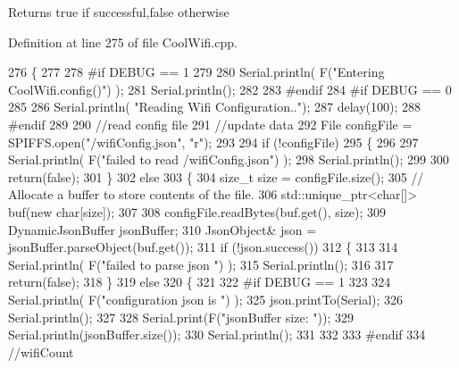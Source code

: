 \begin{DoxyReturn}{Returns}
true if successful,false otherwise 
\end{DoxyReturn}


Definition at line 275 of file Cool\+Wifi.\+cpp.


\begin{DoxyCode}
276 \{
277 
278 \textcolor{preprocessor}{#if DEBUG == 1 }
279 
280     Serial.println( F(\textcolor{stringliteral}{"Entering CoolWifi.config()"}) );
281     Serial.println();
282 
283 \textcolor{preprocessor}{#endif}
284 \textcolor{preprocessor}{#if DEBUG == 0}
285 
286     Serial.println( \textcolor{stringliteral}{"Reading Wifi Configuration.."});
287     delay(100);
288 \textcolor{preprocessor}{#endif }
289 
290     \textcolor{comment}{//read config file}
291     \textcolor{comment}{//update data}
292     File configFile = SPIFFS.open(\textcolor{stringliteral}{"/wifiConfig.json"}, \textcolor{stringliteral}{"r"});
293 
294     \textcolor{keywordflow}{if} (!configFile) 
295     \{
296     
297         Serial.println( F(\textcolor{stringliteral}{"failed to read /wifiConfig.json"}) );
298         Serial.println();
299 
300         \textcolor{keywordflow}{return}(\textcolor{keyword}{false});
301     \}
302     \textcolor{keywordflow}{else}
303     \{
304         \textcolor{keywordtype}{size\_t} size = configFile.size();
305         \textcolor{comment}{// Allocate a buffer to store contents of the file.}
306         std::unique\_ptr<char[]> buf(\textcolor{keyword}{new} \textcolor{keywordtype}{char}[size]);
307 
308         configFile.readBytes(buf.get(), size);
309         DynamicJsonBuffer jsonBuffer;
310         JsonObject& json = jsonBuffer.parseObject(buf.get());
311         \textcolor{keywordflow}{if} (!json.success()) 
312         \{
313 
314             Serial.println( F(\textcolor{stringliteral}{"failed to parse json "}) );
315             Serial.println();
316 
317             \textcolor{keywordflow}{return}(\textcolor{keyword}{false});
318         \} 
319         \textcolor{keywordflow}{else}
320         \{
321         
322 \textcolor{preprocessor}{        #if DEBUG == 1 }
323         
324             Serial.println( F(\textcolor{stringliteral}{"configuration json is "}) );
325             json.printTo(Serial);
326             Serial.println();
327 
328             Serial.print(F(\textcolor{stringliteral}{"jsonBuffer size: "}));
329             Serial.println(jsonBuffer.size());
330             Serial.println();
331 
332 
333 \textcolor{preprocessor}{        #endif}
334             \textcolor{comment}{//wifiCount}

\end{DoxyCode}
